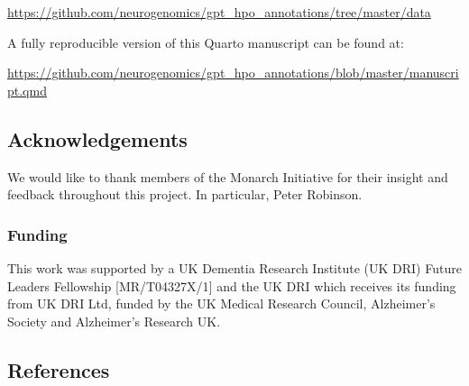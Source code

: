 \documentclass[
]{agujournal2019}
\begin{document}
\url{https://github.com/neurogenomics/gpt_hpo_annotations/tree/master/data}

A fully reproducible version of this Quarto manuscript can be found at:

\url{https://github.com/neurogenomics/gpt_hpo_annotations/blob/master/manuscript.qmd}

\subsection{Acknowledgements}\label{acknowledgements}

We would like to thank members of the Monarch Initiative for their
insight and feedback throughout this project. In particular, Peter
Robinson.

\subsubsection{Funding}\label{funding}

This work was supported by a UK Dementia Research Institute (UK DRI)
Future Leaders Fellowship {[}MR/T04327X/1{]} and the UK DRI which
receives its funding from UK DRI Ltd, funded by the UK Medical Research
Council, Alzheimer's Society and Alzheimer's Research UK.

\subsection*{References}\label{references}
\end{document}
